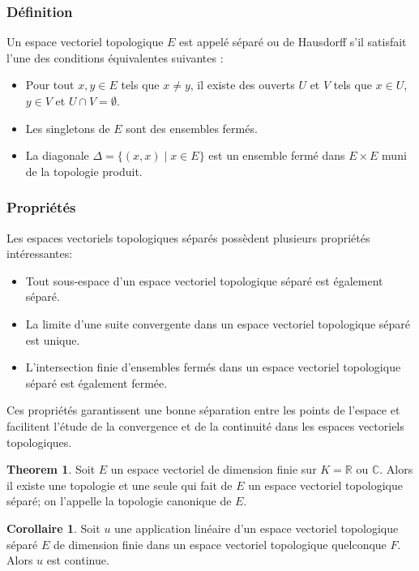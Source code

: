 \documentclass{article}
\theoremstyle{definition}
\newtheorem{theorem}{Theorem}[section]
\newtheorem{corollary}{Corollaire}[section]
\theoremstyle{plain}
\begin{document}
\subsubsection{Définition}

Un espace vectoriel topologique $E$ est appelé séparé ou de Hausdorff s'il satisfait l'une des conditions équivalentes suivantes :

\begin{itemize}
    \item Pour tout $x, y \in E$ tels que $x \neq y$, il existe des ouverts $U$ et $V$ tels que $x \in U$, $y \in V$ et $U \cap V = \emptyset$.
    \item Les singletons de $E$ sont des ensembles fermés.
    \item La diagonale $\Delta = \{(x, x) \mid x \in E\}$ est un ensemble fermé dans $E \times E$ muni de la topologie produit.
\end{itemize}

\subsubsection{Propriétés}

Les espaces vectoriels topologiques séparés possèdent plusieurs propriétés intéressantes:

\begin{itemize}
    \item Tout sous-espace d'un espace vectoriel topologique séparé est également séparé.
    \item La limite d'une suite convergente dans un espace vectoriel topologique séparé est unique.
    \item L'intersection finie d'ensembles fermés dans un espace vectoriel topologique séparé est également fermée.
\end{itemize}

Ces propriétés garantissent une bonne séparation entre les points de l'espace et facilitent l'étude de la convergence et de la continuité dans les espaces vectoriels topologiques.

\begin{theorem}
    Soit $E$ un espace vectoriel de dimension finie sur $K = \mathbb{R}$ ou $\mathbb{C}$. Alors il existe une topologie et une seule qui fait de $E$ un espace vectoriel topologique séparé; on l'appelle la topologie canonique de $E$.
\end{theorem}

\begin{corollary}
    Soit $u$ une application linéaire d'un espace vectoriel topologique séparé $E$ de dimension finie dans un espace vectoriel topologique quelconque $F$. Alors $u$ est continue.

\end{corollary}
\end{document}
